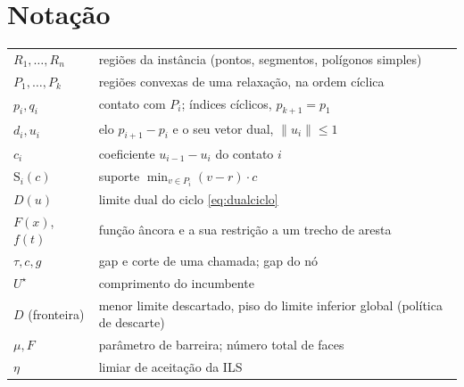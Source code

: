 \documentclass[11pt,a4paper]{article}
\theoremstyle{plain}\newtheorem{proposicao}{Proposição}
\theoremstyle{definition}\newtheorem{definicao}{Definição}
\theoremstyle{plain}\newtheorem{teorema}{Teorema}
\theoremstyle{plain}\newtheorem{lema}{Lema}
\newcommand{\norm}[1]{\lVert#1\rVert}
\newcommand{\supp}{\mathrm{S}}
\begin{document}
\section{Notação}
\begin{center}\small
\begin{tabular}{@{}ll@{}}\toprule
\(R_1,\dots,R_n\) & regiões da instância (pontos, segmentos, polígonos simples)\\
\(P_1,\dots,P_k\) & regiões convexas de uma relaxação, na ordem cíclica\\
\(p_i,q_i\) & contato com \(P_i\); índices cíclicos, \(p_{k+1}=p_1\)\\
\(d_i,u_i\) & elo \(p_{i+1}-p_i\) e o seu vetor dual, \(\norm{u_i}\le1\)\\
\(c_i\) & coeficiente \(u_{i-1}-u_i\) do contato \(i\)\\
\(\supp_i(c)\) & suporte \(\min_{v\in P_i}(v-r)\cdot c\)\\
\(D(u)\) & limite dual do ciclo \eqref{eq:dualciclo}\\
\(F(x)\), \(f(t)\) & função âncora e a sua restrição a um trecho de aresta\\
\(\tau,c,g\) & gap e corte de uma chamada; gap do nó\\
\(U^\star\) & comprimento do incumbente\\
\(D\) (fronteira) & menor limite descartado, piso do limite inferior global (política de descarte)\\
\(\mu,F\) & parâmetro de barreira; número total de faces\\
\(\eta\) & limiar de aceitação da ILS\\\bottomrule
\end{tabular}
\end{center}
\end{document}
